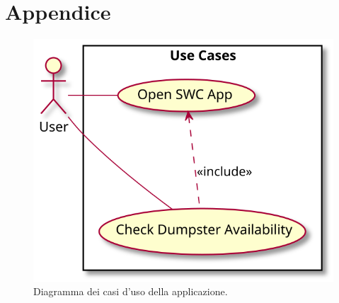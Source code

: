 \section{Appendice}

\begin{figure}[H]
    \centering
    \includegraphics[width=\textwidth]{uml/app-use-case.pm.svg}
    \caption{Diagramma dei casi d'uso della applicazione.}
    \label{fig:app-use-case}
\end{figure}

